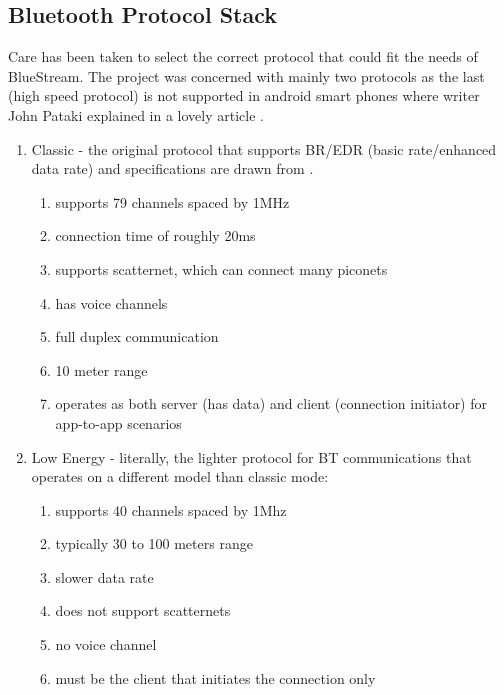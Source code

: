 \documentclass[a4paper,12pt]{article}
\begin{document}
\subsection{Bluetooth Protocol Stack}

Care has been taken to select the correct protocol that could fit the needs of BlueStream. The project was concerned with mainly two protocols as the last (high speed protocol) is not supported in android smart phones where writer John Pataki explained in a lovely article \cite{UnderstandingBTForAndroid}. 

\begin{enumerate}

\item Classic - the original protocol that supports BR/EDR (basic rate/enhanced data rate) and specifications are drawn from \cite{InsideBlueTooth}. 

\begin{enumerate}
\item supports 79 channels spaced by 1MHz 
\item connection time of roughly 20ms
\item supports scatternet, which can connect many piconets
\item has voice channels 
\item full duplex communication
\item 10 meter range
\item operates as both server (has data) and client (connection initiator) for app-to-app scenarios
\end{enumerate}
\item Low Energy - literally, the lighter protocol for BT communications that operates on a different model than classic mode:
    \begin{enumerate}
    \item supports 40 channels spaced by 1Mhz
    \item typically 30 to 100 meters range
    \item slower data rate
    \item does not support scatternets
    \item no voice channel
    \item must be the client that initiates the connection only
    \end{enumerate}
\end{enumerate}
\end{document}
